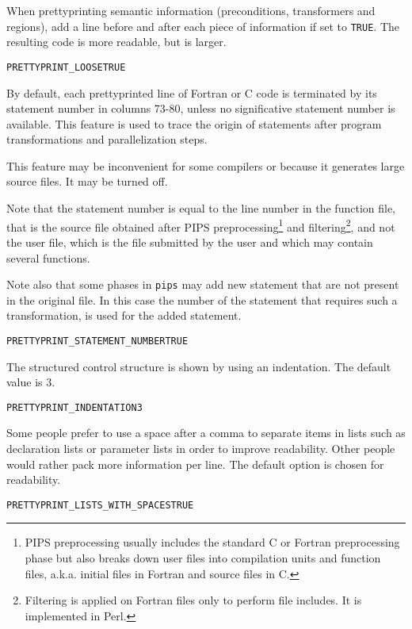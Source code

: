 \documentclass[a4paper]{report}
\newenvironment{PipsProp}{\begin{alltt}}{\end{alltt}}
\begin{document}
When prettyprinting semantic information (preconditions, transformers and
regions), add a line before and after each piece of information if set to
\verb+TRUE+. The resulting code is more readable, but is larger. 

\begin{PipsProp}
PRETTYPRINT_LOOSE TRUE
\end{PipsProp}

By default, each prettyprinted line of Fortran or C code is terminated by its
statement number in columns 73-80, unless no significative statement
number is available. This feature is used to trace the origin of
statements after program transformations and parallelization steps.

This feature may be inconvenient for some compilers or because it
generates large source files. It may be turned off.

Note that the statement number is equal to the line number in the
function file, that is the source file obtained after PIPS
preprocessing\footnote{PIPS preprocessing usually includes the
standard C or Fortran preprocessing phase but also breaks down user
files into compilation units and function files, a.k.a. initial files
in Fortran and source files in C.} and filtering\footnote{Filtering is
applied on Fortran files only to perform file includes. It is
implemented in Perl.}, and not the user file, which is the file
submitted by the user and which may contain several functions.

Note also that some phases in \texttt{pips} may add new statement
that are not present in the original file. In this case the number of
the statement that requires such a transformation, is used for the
added statement.

\begin{PipsProp}
PRETTYPRINT_STATEMENT_NUMBER TRUE
\end{PipsProp}

The structured control structure is shown by using an indentation. The
default value is 3.

\begin{PipsProp}
PRETTYPRINT_INDENTATION 3
\end{PipsProp}

Some people prefer to use a space after a comma to separate items in
lists such as declaration lists or parameter lists in order to improve
readability. Other people would rather pack more information per
line. The default option is chosen for readability.

\begin{PipsProp}
PRETTYPRINT_LISTS_WITH_SPACES TRUE
\end{PipsProp}
\end{document}
